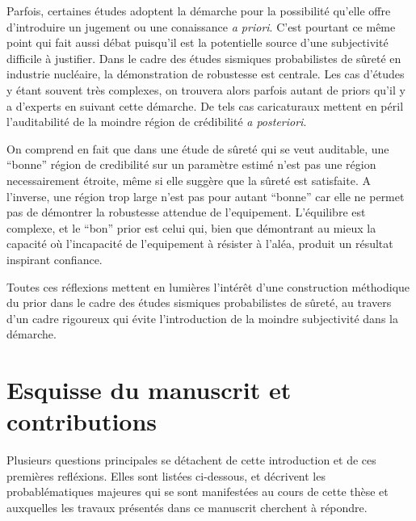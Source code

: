 Parfois, certaines études adoptent la démarche pour la possibilité qu'elle offre d'introduire un jugement  ou une conaissance \emph{a priori}.
C'est pourtant ce même point qui fait aussi débat puisqu'il est la potentielle source d'une subjectivité difficile à justifier.
Dans le cadre des études sismiques probabilistes de sûreté en industrie nucléaire, la démonstration de robustesse est centrale. Les cas d'études y étant souvent très complexes, on trouvera alors parfois autant de priors qu'il y a d'experts en suivant cette démarche.
De tels cas caricaturaux mettent en péril l'auditabilité de la moindre région de crédibilité \emph{a posteriori}.


On comprend en fait que dans une étude de sûreté qui se veut auditable, une ``bonne'' région de credibilité sur un paramètre estimé n'est pas une région necessairement étroite, même si elle suggère que la sûreté est satisfaite. A l'inverse, une région trop large n'est pas pour autant ``bonne'' car elle ne permet pas de démontrer la robustesse attendue de l'equipement. L'équilibre est complexe, et le ``bon'' prior est celui qui, bien que démontrant au mieux la capacité où l'incapacité de l'equipement à résister à l'aléa, produit un résultat inspirant confiance. %

Toutes ces réflexions mettent en lumières l'intérêt d'une construction méthodique du prior dans le cadre des études sismiques probabilistes de sûreté, au travers d'un cadre rigoureux qui évite l'introduction de la moindre subjectivité dans la démarche.










\section{Esquisse du manuscrit et contributions}


Plusieurs questions principales se détachent de cette introduction et de ces premières refléxions. Elles sont listées ci-dessous, et décrivent les probablématiques majeures qui se sont manifestées au cours de cette thèse et auxquelles les travaux présentés dans ce manuscrit cherchent à répondre.

